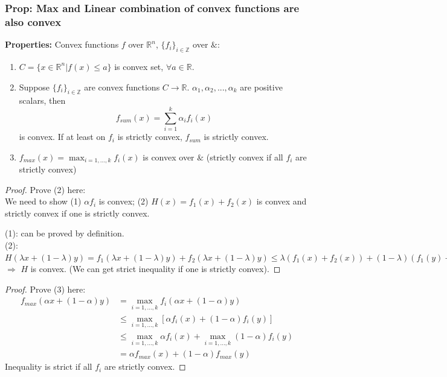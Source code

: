 \documentclass[11pt,a4paper]{article}
\begin{document}
\subsubsection{Prop: Max and Linear combination of convex functions are also convex}
\textbf{Properties: }Convex functions $f$ over $\mathbb{R}^n$, $\{f_i\}_{i\in \mathbb{Z}}$ over $\&$:
\begin{enumerate}[(1)]
    \item $C=\{x\in \mathbb{R}^n| f(x)\leq a\}$ is convex set, $\forall a\in \mathbb{R}$.
    \item Suppose $\{f_i\}_{i\in \mathbb{Z}}$ are convex functions $C \rightarrow \mathbb{R}$. $\alpha_1,\alpha_2,...,\alpha_k$ are positive scalars, then $$f_{sum}(x)=\sum_{i=1}^k\alpha_if_i(x)$$ is convex. If at least on $f_i$ is strictly convex, $f_{sum}$ is strictly convex.
    \item $f_{max}(x)=\max_{i=1,...,k}f_i(x)$ is convex over $\&$ (strictly convex if all $f_i$ are strictly convex)
\end{enumerate}
\begin{proof} Prove (2) here:\\
    We need to show (1) $\alpha f_i$ is convex; (2) $H(x)=f_1(x)+f_2(x)$ is convex and strictly convex if one is strictly convex.

    (1): can be proved by definition.\\
    (2): $H(\lambda x+(1-\lambda)y)=f_1(\lambda x+(1-\lambda)y)+f_2(\lambda x+(1-\lambda)y)\leq \lambda (f_1(x)+f_2(x))+(1-\lambda)(f_1(y)+f_2(y))=\lambda H(x)+(1-\lambda)H(y),\lambda\in [0,1]$ $\Rightarrow$ $H$ is convex. (We can get strict inequality if one is strictly convex).
\end{proof}
\begin{proof} Prove (3) here:
\begin{equation}
    \begin{aligned}
        f_{max}(\alpha x+(1-\alpha)y)&=\max_{i=1,...,k}f_i(\alpha x+(1-\alpha)y)\\
    &\leq \max_{i=1,...,k}[\alpha f_i(x)+(1-\alpha)f_i(y)]\\
    &\leq \max_{i=1,...,k}\alpha f_i(x)+\max_{i=1,...,k}(1-\alpha)f_i(y)\\
    &=\alpha f_{max}(x)+(1-\alpha)f_{max}(y)
    \end{aligned}
    \nonumber
\end{equation}
Inequality is strict if all $f_i$ are strictly convex.
\end{proof}
\end{document}
